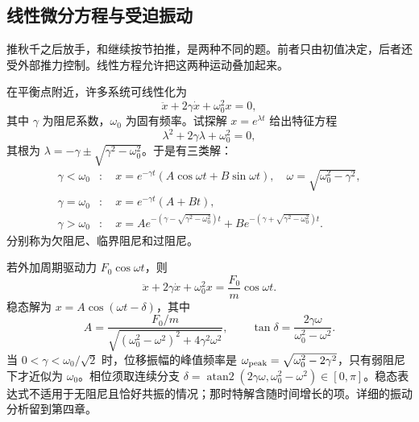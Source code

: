 \subsection{线性微分方程与受迫振动}

推秋千之后放手，和继续按节拍推，是两种不同的题。前者只由初值决定，后者还受外部推力控制。线性方程允许把这两种运动叠加起来。

在平衡点附近，许多系统可线性化为
\begin{equation}
\ddot x+2\gamma\dot x+\omega_0^2x=0,
\label{eq:damped}
\end{equation}
其中 $\gamma$ 为阻尼系数，$\omega_0$ 为固有频率。试探解 $x=e^{\lambda t}$ 给出特征方程
\begin{equation}
\lambda^2+2\gamma\lambda+\omega_0^2=0,
\end{equation}
其根为 $\lambda=-\gamma\pm\sqrt{\gamma^2-\omega_0^2}$。于是有三类解：
\begin{align}
\gamma<\omega_0 &: \quad x=e^{-\gamma t}\left(A\cos\omega t+B\sin\omega t\right),\quad \omega=\sqrt{\omega_0^2-\gamma^2},\\
\gamma=\omega_0 &: \quad x=e^{-\gamma t}\left(A+Bt\right),\\
\gamma>\omega_0 &: \quad x=Ae^{-(\gamma-\sqrt{\gamma^2-\omega_0^2})t}
+B e^{-(\gamma+\sqrt{\gamma^2-\omega_0^2})t}.
\end{align}
分别称为欠阻尼、临界阻尼和过阻尼。

若外加周期驱动力 $F_0\cos\omega t$，则
\begin{equation}
\ddot x+2\gamma\dot x+\omega_0^2x=\frac{F_0}{m}\cos\omega t .
\end{equation}
稳态解为 $x=A\cos(\omega t-\delta)$，其中
\begin{equation}
A=\frac{F_0/m}{\sqrt{(\omega_0^2-\omega^2)^2+4\gamma^2\omega^2}},\qquad
\tan\delta=\frac{2\gamma\omega}{\omega_0^2-\omega^2}.
\label{eq:resonance}
\end{equation}
当 $0<\gamma<\omega_0/\sqrt2$ 时，位移振幅的峰值频率是 $\omega_{\rm peak}=\sqrt{\omega_0^2-2\gamma^2}$，只有弱阻尼下才近似为 $\omega_0$。相位须取连续分支 $\delta=\operatorname{atan2}(2\gamma\omega,\omega_0^2-\omega^2)\in[0,\pi]$。稳态表达式不适用于无阻尼且恰好共振的情况；那时特解含随时间增长的项。详细的振动分析留到第四章。

